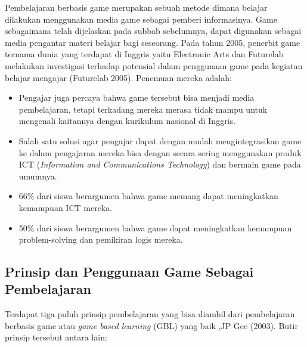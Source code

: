 	Pembelajaran berbasis game merupakan sebuah metode dimana belajar dilakukan menggunakan media game sebagai pemberi informasinya. Game sebagaimana telah dijelaskan pada subbab sebelumnya, dapat digunakan sebagai media pengantar materi belajar bagi seseorang. 
	\linebreak\linebreak
	Pada tahun 2005, penerbit game ternama dunia yang terdapat di Inggris yaitu Electronic Arts dan Futurelab melakukan investigasi terhadap potensial dalam penggunaan game pada kegiatan belajar mengajar (Futurelab 2005). Penemuan mereka adalah:
	\begin{itemize}
		\item Pengajar juga percaya bahwa game tersebut bisa menjadi media pembelajaran, tetapi terkadang mereka merasa tidak mampu untuk mengenali kaitannya dengan kurikulum nasional di Inggris.
		\item Salah satu solusi agar pengajar dapat dengan mudah mengintegrasikan game ke dalam pengajaran mereka bisa dengan secara sering menggunakan produk ICT (\textit{Information and Communications Technology}) dan bermain game pada umumnya.
		\item 66\% dari siswa berargumen bahwa game memang dapat meningkatkan kemampuan ICT mereka.
		\item 50\% dari siswa berargumen bahwa game dapat meningkatkan kemampuan problem-solving dan pemikiran logis mereka.
	\end{itemize}
	
	\subsection{Prinsip dan Penggunaan Game Sebagai Pembelajaran}
	
	Terdapat tiga puluh prinsip pembelajaran yang bisa diambil dari pembelajaran berbasis game atau \textit{game based learning} (GBL) yang baik ,JP Gee (2003). Butir prinsip tersebut antara lain:
	
